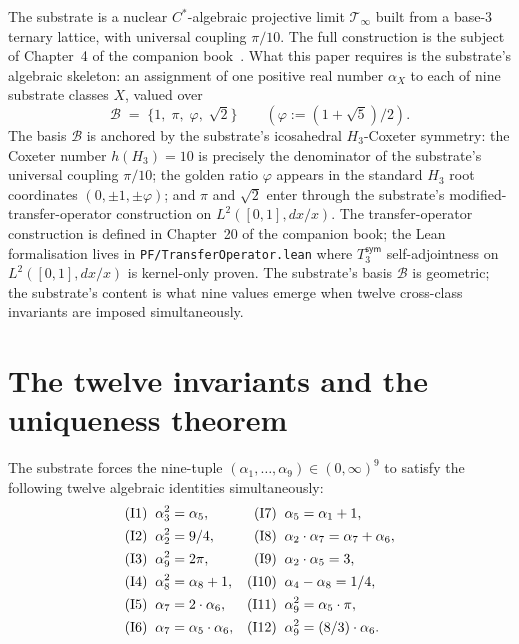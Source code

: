 \documentclass[11pt,a4paper]{amsart}
\theoremstyle{plain}
\theoremstyle{definition}
\begin{document}
The substrate is a nuclear $C^{*}$-algebraic projective limit $\mathcal{T}_\infty$ built from a base-$3$ ternary lattice, with universal coupling $\pi/10$. The full construction is the subject of Chapter~4 of the companion book~\cite{cohen2026book}. What this paper requires is the substrate's algebraic skeleton: an assignment of one positive real number $\alpha_X$ to each of nine substrate classes $X$, valued over
\[
\mathcal{B} \;=\; \{1,\;\pi,\;\varphi,\;\sqrt{2}\} \qquad (\varphi := (1+\sqrt{5})/2).
\]
The basis $\mathcal{B}$ is anchored by the substrate's icosahedral $H_3$-Coxeter symmetry: the Coxeter number $h(H_3) = 10$ is precisely the denominator of the substrate's universal coupling $\pi/10$; the golden ratio $\varphi$ appears in the standard $H_3$ root coordinates $(0, \pm 1, \pm \varphi)$; and $\pi$ and $\sqrt{2}$ enter through the substrate's modified-transfer-operator construction on $L^2([0,1], dx/x)$. The transfer-operator construction is defined in Chapter~20 of the companion book; the Lean formalisation lives in \texttt{PF/TransferOperator.lean} where $T_3^{\textsf{sym}}$ self-adjointness on $L^2([0,1], dx/x)$ is kernel-only proven. The substrate's basis $\mathcal{B}$ is geometric; the substrate's content is what nine values emerge when twelve cross-class invariants are imposed simultaneously.

\section{The twelve invariants and the uniqueness theorem}\label{sec:invariants}

The substrate forces the nine-tuple $(\alpha_1, \ldots, \alpha_9) \in (0,\infty)^9$ to satisfy the following twelve algebraic identities simultaneously:
\begin{align*}
\textup{(I1)}\;\;& \alpha_3^2 = \alpha_5, &
\textup{(I7)}\;\;& \alpha_5 = \alpha_1 + 1,\\
\textup{(I2)}\;\;& \alpha_2^2 = 9/4, &
\textup{(I8)}\;\;& \alpha_2\cdot\alpha_7 = \alpha_7 + \alpha_6,\\
\textup{(I3)}\;\;& \alpha_9^2 = 2\pi, &
\textup{(I9)}\;\;& \alpha_2\cdot\alpha_5 = 3,\\
\textup{(I4)}\;\;& \alpha_8^2 = \alpha_8 + 1, &
\textup{(I10)}\;\;& \alpha_4 - \alpha_8 = 1/4,\\
\textup{(I5)}\;\;& \alpha_7 = 2\cdot\alpha_6, &
\textup{(I11)}\;\;& \alpha_9^2 = \alpha_5\cdot\pi,\\
\textup{(I6)}\;\;& \alpha_7 = \alpha_5\cdot\alpha_6, &
\textup{(I12)}\;\;& \alpha_9^2 = (8/3)\cdot\alpha_6.
\end{align*}
\end{document}
